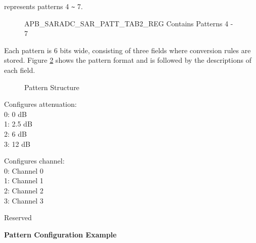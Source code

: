 \documentclass[main\_\_EN.tex]{subfiles}
\begin{document}
%
%
%
%
%
\begin{regdesc}\begin{reglist}
\item [cmd \regindex{x}] represents patterns 4 \verb+~+ 7.
\end{reglist}\end{regdesc}
\vspace{-2em}
\begin{figure}[H]
    \centering
    \caption{APB\_SARADC\_SAR\_PATT\_TAB2\_REG Contains Patterns 4 - 7}
    \label{fig:adc-apb-saradc-sar-patt-tab2-reg-pattern-tab-entry4-entry7}
\end{figure}

Each pattern is 6 bits wide, consisting of three fields where conversion rules are stored. Figure  \ref{fig:adc-pattern-table-entry} shows the pattern format and is followed by the descriptions of each field.

\begin{figure}[H]
\centering
{}%
%
%
\end{figure}
\vspace{-2em}
\begin{figure}[H]
    \centering
    \caption{Pattern Structure}
    \label{fig:adc-pattern-table-entry}
\end{figure}
\vspace{-2em}
\begin{regdesc}\begin{reglist}
\item [atten] Configures attenuation:\\
0: 0 dB\\
1: 2.5 dB\\
2: 6 dB\\
3: 12 dB
\item [ch\_sel] Configures channel:\\
0: Channel 0 \\
1: Channel 1 \\
2: Channel 2 \\
3: Channel 3 \\
\item [(reserved)] Reserved
\end{reglist}\end{regdesc}

\textbf{Pattern Configuration Example}
\end{document}
